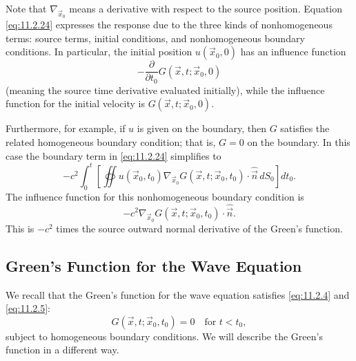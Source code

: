 Note that $\nabla_{\vec{x}_0}$ means a derivative with respect to the source position.  Equation \eqref{eq:11.2.24} expresses the response due to the three kinds of nonhomogeneous terms: source terms, initial conditions, and nonhomogeneous boundary conditions.  In particular, the initial position $u(\vec{x}_0,0)$ has an influence function
\[
-\frac{\partial}{\partial t_0}G(\vec{x},t;\vec{x}_0,0)
\]
(meaning the source time derivative evaluated initially), while the influence function for the initial velocity is $G(\vec{x},t;\vec{x}_0,0)$.

Furthermore, for example, if $u$ is given on the boundary, then $G$ satisfies the related homogeneous boundary condition; that is, $G = 0$ on the boundary.  In this case the boundary term in \eqref{eq:11.2.24} simplifies to
\[
-c^2 \int_0^t \left[\oiint u(\vec{x}_0,t_0)\nabla_{\vec{x}_0} G(\vec{x},t;\vec{x}_0,t_0)\cdot\hat{\vec{n}}\,dS_0\right] dt_0.
\]
The influence function for this nonhomogeneous boundary condition is
\[
-c^2 \nabla_{\vec{x}_0} G(\vec{x},t;\vec{x}_0,t_0)\cdot\hat{\vec{n}}.
\]
This is $-c^2$ times the source outward normal derivative of the Green's function.

\subsection{Green's Function for the Wave Equation}
\label{subsec:greens-fn-wave}

We recall that the Green's function for the wave equation satisfies \eqref{eq:11.2.4} and \eqref{eq:11.2.5}:
\begin{equation}
\label{eq:11.2.26}
G(\vec{x},t;\vec{x}_0,t_0) = 0 \quad \text{for } t < t_0,
\end{equation}
subject to homogeneous boundary conditions.  We will describe the Green's function in a different way.

